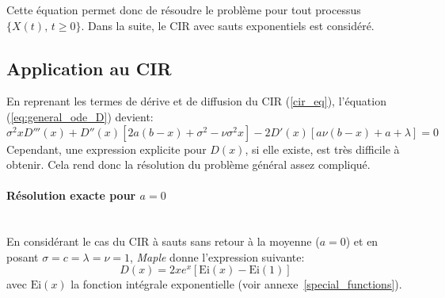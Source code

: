 Cette équation permet donc de résoudre le problème pour tout processus \(\{X(t),\,t\geq0\}\). Dans la suite, le \acs{CIR} avec sauts exponentiels est considéré.
\subsection{Application au CIR}
En reprenant les termes de dérive et de diffusion du \acs{CIR} (\ref{cir_eq}), l'équation (\ref{eq:general_ode_D}) devient:
\[
\sigma ^2 x D'''(x)+D''(x) \left[2 a (b-x)+\sigma ^2-\nu  \sigma ^2x\right]-2 D'(x) [a \nu  (b-x)+a+\lambda ]=0
\]
Cependant, une expression explicite pour $D(x)$, si elle existe, est très difficile à obtenir. Cela rend donc la résolution du problème général assez compliqué. 
\paragraph{Résolution exacte pour $a=0$}\phantom{}\\
En considérant le cas du \acs{CIR} à sauts sans retour à la moyenne ($a=0$) et en posant \(\sigma=c=\lambda=\nu=1\), \textit{Maple}  donne l'expression suivante:
\begin{equation}\label{overshoot_exact_sol}
    D(x)=2xe^{x}\left[\text{Ei}(x)-\text{Ei}(1)\right]
\end{equation}
avec $\text{Ei}(x)$ la fonction intégrale exponentielle (voir annexe~\ref{special_functions}).
